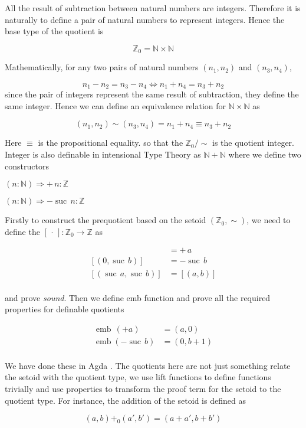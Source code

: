 \documentclass[envcountsame]{llncs}
\newcommand{\N}{\mathbb{N}}
\newcommand{\Z}{\mathbb{Z}}
\newcommand{\dotph}{\,\cdot\,}
\providecommand{\class}[1]{[#1]}
\DeclareMathOperator{\emb}{emb}
\DeclareMathOperator{\suc}{suc\,}
\begin{document}
All the result of subtraction between natural numbers are integers. Therefore it is naturally to define a pair of
natural numbers to represent integers. Hence the base type of the quotient is

$$\Z_0=\N \times \N$$

Mathematically, for any two pairs of natural numbers $(n_1, n_2)$ and $(n_3, n_4)$, 

$$ n_1 - n_2 = n_3 - n_4\iff n_1 + n_4 = n_3 + n_2$$
since the pair of integers represent the same result of subtraction, they define the same integer. Hence we can define an equivalence relation for $\N \times \N$ as

\[ (n_1, n_2) \sim (n_3, n_4) = n_1 + n_4 \equiv n_3 + n_2 
 \]


Here $\equiv$ is the propositional equality. so that the $\Z_0/\sim$ is the quotient integer.
Integer is also definable in intensional Type Theory as $\N+\N$ where we define two constructors

$ (n \colon \N) \Rightarrow + \,n \colon\Z$

$ (n \colon \N) \Rightarrow -\suc n \colon\Z$


Firstly to construct the prequotient based on the setoid $(\Z_0,\sim)$, we need to define the $\class\dotph \colon \Z_0 \to \Z$ as

\begin{align*}
\class{(a,0)} &= +\,a\\
\class{(0,\suc b)} &= -\suc b\\
\class{(\suc a,\suc b)} &= \class{(a,b)}\\
\end{align*}

and prove \emph{sound}. Then we define emb function and prove all the required properties for definable quotients


\begin{align*}
\emb \,(+ a) &= (a,0)\\
\emb (-\suc b) &= (0,b+1)\\
\end{align*}

We have done these in Agda \cite{nuo:10}. The quotients here are not just something relate the setoid with the quotient type, we use lift functions to define functions trivially and use properties to transform the proof term for the setoid to the quotient type. For instance, the addition of the setoid is defined as

$$(a,b){+_0}(a', b')= (a+a',b+b')$$
\end{document}
